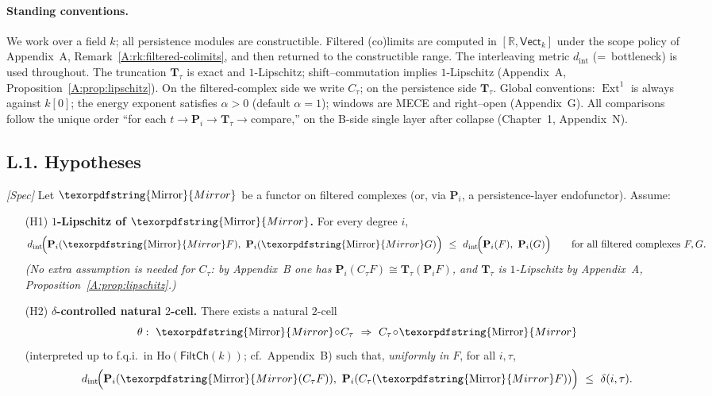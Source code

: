 \documentclass[11pt]{article}
\numberwithin{equation}{section}
\theoremstyle{plain}
\theoremstyle{definition}
\theoremstyle{remark}
\DeclareMathOperator{\Ext}{Ext}
\newcommand{\Ho}{\mathrm{Ho}}
\theoremstyle{plain}
\theoremstyle{definition}
\numberwithin{equation}{section}
\theoremstyle{definition}
\DeclareRobustCommand{\Mirror}{\texorpdfstring{\ensuremath{\operatorname{Mirror}}}{Mirror}}
\numberwithin{equation}{section}
\theoremstyle{plain}
\theoremstyle{definition}
\theoremstyle{remark}
\begin{document}
\paragraph{Standing conventions.}
We work over a field \(k\); all persistence modules are constructible.
Filtered (co)limits are computed in \([\mathbb{R},\mathsf{Vect}_k]\) under the scope policy of Appendix~A, Remark~\ref{A:rk:filtered-colimits}, and then returned to the constructible range.
The interleaving metric \(d_{\mathrm{int}}\) (=\ bottleneck) is used throughout.
The truncation \(\mathbf{T}_\tau\) is exact and \(1\)-Lipschitz; shift–commutation implies \(1\)-Lipschitz (Appendix~A, Proposition~\ref{A:prop:lipschitz}).
On the filtered-complex side we write \(C_\tau\); on the persistence side \(\mathbf{T}_\tau\).
Global conventions: \(\Ext^1\) is always against \(k[0]\); the energy exponent satisfies \(\alpha>0\) (default \(\alpha=1\)); windows are MECE and right–open (Appendix~G).
All comparisons follow the unique order “for each \(t\)\(\to\)\(\mathbf{P}_i\)\(\to\)\(\mathbf{T}_\tau\)\(\to\)compare,” on the B-side single layer after collapse (Chapter~1, Appendix~N).

\subsection*{L.1. Hypotheses}
\emph{[Spec]} Let \(\Mirror\) be a functor on filtered complexes (or, via \(\mathbf{P}_i\), a persistence-layer endofunctor). Assume:

\begin{itemize}\itemsep0.35em
  \item[(H1)] \textbf{\(1\)-Lipschitz of \(\Mirror\).} For every degree \(i\),
  \[
    d_{\mathrm{int}}\!\Big(\mathbf{P}_i(\Mirror F),\ \mathbf{P}_i(\Mirror G)\Big)
       \ \le\ d_{\mathrm{int}}\!\Big(\mathbf{P}_i(F),\ \mathbf{P}_i(G)\Big)
       \qquad\text{for all filtered complexes }F,G.
  \]
  \emph{(No extra assumption is needed for \(C_\tau\): by Appendix~B one has
  \(\mathbf{P}_i(C_\tau F)\cong \mathbf{T}_\tau(\mathbf{P}_iF)\), and \(\mathbf{T}_\tau\) is \(1\)-Lipschitz by Appendix~A, Proposition~\ref{A:prop:lipschitz}.)}
  \item[(H2)] \textbf{\(\delta\)-controlled natural \(2\)-cell.} There exists a natural \(2\)-cell
  \[
    \theta:\ \Mirror\!\circ\! C_\tau\ \Rightarrow\ C_\tau\!\circ\!\Mirror
  \]
  (interpreted up to f.q.i.\ in \(\Ho(\mathsf{FiltCh}(k))\); cf.\ Appendix~B) such that, \emph{uniformly in \(F\)}, for all \(i,\tau\),
  \[
    d_{\mathrm{int}}\!\Big(\mathbf{P}_i(\Mirror(C_\tau F)),\ \mathbf{P}_i(C_\tau(\Mirror F))\Big)\ \le\ \delta(i,\tau).
  \]
\end{itemize}
\end{document}
